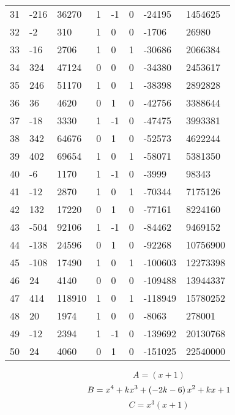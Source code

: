\documentclass{amsart}
\begin{document}
\begin{longtable}{|l|l|l|lllll|}
31&-216&36270&1&-1&0&-24195&1454625\\
32&-2&310&1&0&0&-1706&26980\\
33&-16&2706&1&0&1&-30686&2066384\\
34&324&47124&0&0&0&-34380&2453617\\
35&246&51170&1&0&1&-38398&2892828\\
36&36&4620&0&1&0&-42756&3388644\\
37&-18&3330&1&-1&0&-47475&3993381\\
38&342&64676&0&1&0&-52573&4622244\\
39&402&69654&1&0&1&-58071&5381350\\
40&-6&1170&1&-1&0&-3999&98343\\
41&-12&2870&1&0&1&-70344&7175126\\
42&132&17220&0&1&0&-77161&8224160\\
43&-504&92106&1&-1&0&-84462&9469152\\
44&-138&24596&0&1&0&-92268&10756900\\
45&-108&17490&1&0&1&-100603&12273398\\
46&24&4140&0&0&0&-109488&13944337\\
47&414&118910&1&0&1&-118949&15780252\\
48&20&1974&1&0&0&-8063&278001\\
49&-12&2394&1&-1&0&-139692&20130768\\
50&24&4060&0&1&0&-151025&22540000\\
\hline
\end{longtable}
$$A=(x
 + 1)$$
$$B=x^4
 + k\*x^3
 + \left(-2\*k
 - 6\right) \*x^2
 + k\*x
 + 1$$
$$C=x^3(x
 + 1)$$
\end{document}
